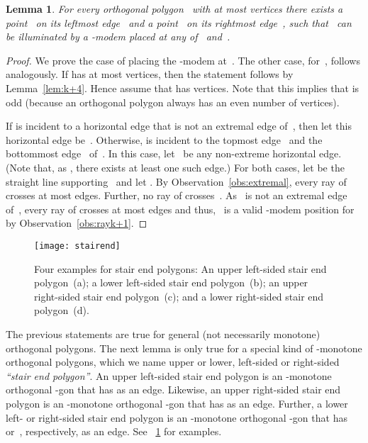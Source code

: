\documentclass[A4]{article}
\newtheorem{lemma}[theorem]{Lemma}
\begin{document}
\begin{lemma}\label{lem:k+5}
For every orthogonal polygon~ with at most  vertices there exists a point~ on its leftmost edge~ and a point~ on its rightmost edge~, such that~ can be illuminated by a \mbox{-modem} placed at any of~ and~.
\end{lemma}
\begin{proof}
We prove the case of placing the \mbox{-modem} at~.
The other case, for~, follows analogously.
If  has at most  vertices, then the statement follows by Lemma~\ref{lem:k+4}.
Hence assume that  has  vertices. Note that this implies that  is odd (because an orthogonal polygon always has an even number of vertices).

If  is incident to a horizontal edge that is not an extremal edge of~, then let this horizontal edge be~.
Otherwise,  is incident to the topmost edge~ and the bottommost edge~ of~.
In this case, let~ be any non-extreme horizontal edge.
(Note that, as , there exists at least one such edge.)
For both cases, let  be the straight line supporting~ and let .
By Observation~\ref{obs:extremal}, every ray of  crosses at most  edges.
Further, no ray of  crosses~.
As~ is not an extremal edge of~, every ray of  crosses at most  edges and thus,~ is a valid \mbox{-modem} position for~ by Observation~\ref{obs:rayk+1}.
\end{proof}


\begin{figure}[htb]
  \centering
  \texttt{[image: stairend]}
  \caption{Four examples for stair end polygons:
	  An upper left-sided stair end polygon~(a);
  	  a lower left-sided stair end polygon~(b);
	  an upper right-sided stair end polygon~(c); and 
  	  a lower right-sided stair end polygon~(d).}
  \label{fig:stairend}
\end{figure}

The previous statements are true for general (not necessarily monotone) orthogonal polygons.
The next lemma is only true for a special kind of -monotone orthogonal polygons, which we name upper or lower, left-sided or right-sided \emph{``stair end polygon''}.
An upper left-sided stair end polygon is an -monotone orthogonal -gon that has  as an edge.
Likewise, an upper right-sided stair end polygon is an -monotone orthogonal -gon that has  as an edge.
Further, a lower left- or right-sided stair end polygon is an -monotone orthogonal -gon that has~ or~, respectively, as an edge.
See \figurename~\ref{fig:stairend} for examples.
\end{document}
